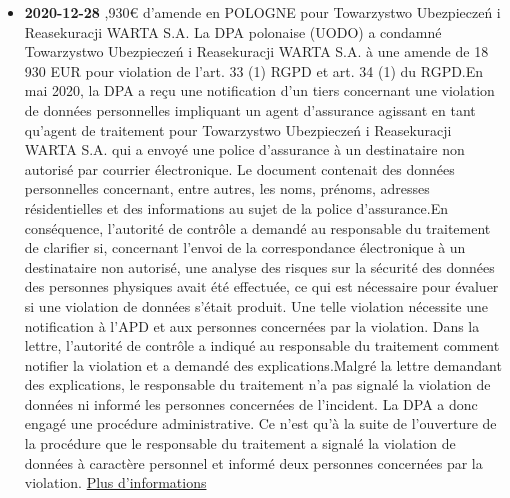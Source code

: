 \documentclass[french]{article}
\begin{document}
\begin{multicols}{2}
\begin{itemize}
			\item \textbf{2020-12-28} ,930€ d'amende en POLOGNE pour Towarzystwo Ubezpieczeń i Reasekuracji WARTA S.A.
			\newline
			La DPA polonaise (UODO) a condamné Towarzystwo Ubezpieczeń i Reasekuracji WARTA S.A. à une amende de 18 930 EUR pour violation de l'art. 33 (1) RGPD et art. 34 (1) du RGPD.En mai 2020, la DPA a reçu une notification d'un tiers concernant une violation de données personnelles impliquant un agent d'assurance agissant en tant qu'agent de traitement pour Towarzystwo Ubezpieczeń i Reasekuracji WARTA S.A. qui a envoyé une police d'assurance à un destinataire non autorisé par courrier électronique. Le document contenait des données personnelles concernant, entre autres, les noms, prénoms, adresses résidentielles et des informations au sujet de la police d'assurance.En conséquence, l'autorité de contrôle a demandé au responsable du traitement de clarifier si, concernant l'envoi de la correspondance électronique à un destinataire non autorisé, une analyse des risques sur la sécurité des données des personnes physiques avait été effectuée, ce qui est nécessaire pour évaluer si une violation de données s'était produit. Une telle violation nécessite une notification à l'APD et aux personnes concernées par la violation. Dans la lettre, l'autorité de contrôle a indiqué au responsable du traitement comment notifier la violation et a demandé des explications.Malgré la lettre demandant des explications, le responsable du traitement n'a pas signalé la violation de données ni informé les personnes concernées de l'incident. La DPA a donc engagé une procédure administrative. Ce n'est qu'à la suite de l'ouverture de la procédure que le responsable du traitement a signalé la violation de données à caractère personnel et informé deux personnes concernées par la violation.
			\newline
			\href{https://uodo.gov.pl/decyzje/DKN.5131.5.2020}{Plus d'informations}
		\end{itemize}
	\end{multicols}
\end{document}
